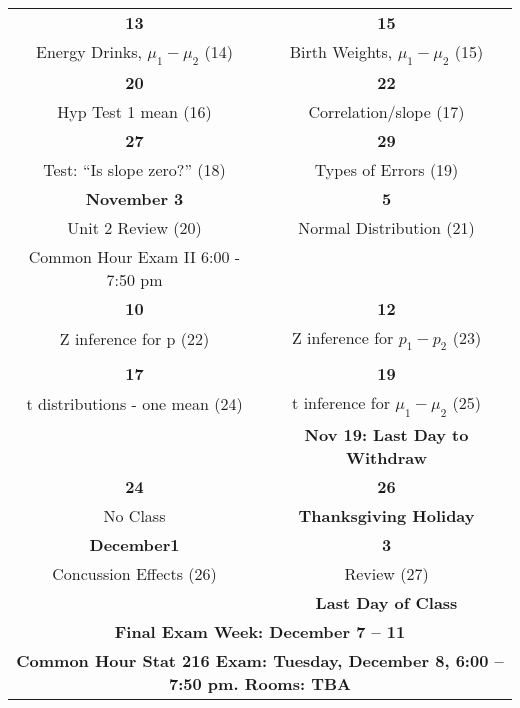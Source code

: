 \begin{center}
\begin{tabular}{|c|c|}
   \hfill\bf{13} & \hfill\bf{15} \\
 Energy Drinks, $\mu_1 - \mu_2$  \small{(14)}& 
 Birth Weights, $\mu_1 - \mu_2$ \small{(15)}  \\ 
\hline

 \hfill\bf{20}  & \hfill\bf{22} \\
Hyp Test 1 mean   \small{(16)}   &   
 Correlation/slope \small{(17)}\\ \hline

  \hfill\bf{27} & \hfill\bf{29} \\
  Test: ``Is slope zero?'' \small{(18)} &  
Types of Errors \small{(19)} %
 \\ \hline

   \bf{November} \hfill\bf{3} & \hfill\bf{5} \\
 Unit 2  Review   \small{(20)}&  
 Normal Distribution \small{(21)}  %
 \\
Common Hour Exam II 6:00 - 7:50 pm & \\
 \hline

   \hfill\bf{10} & \hfill\bf{12} \\
  Z inference for p   \small{(22)} 
 & Z inference for $p_1-p_2$  \small{(23)}
  \\
   &  \\ \hline

   \hfill\bf{17}  &  \hfill\bf{19}  \\
  t distributions - one mean  \small{(24)}&
  t inference for $\mu_1- \mu_2$  \small{(25)}\\ 
  &
   \small\bf{Nov 19: Last Day to Withdraw} \\ \hline
 
 \hfill\bf{24} & \hfill\bf{26} \\
No Class 
 & {\bf Thanksgiving Holiday} 
\\ \hline

  {\bf December}\hfill\bf{1} & \hfill\bf{3} \\
  Concussion Effects \small{(26)}
  & Review    \small{(27)}
\\
  &  \small\bf{ Last Day of Class}  \\ \hline

  \multicolumn{2}{|c|}{\textbf{Final Exam Week: December 7 -- 11 }} \\
  \multicolumn{2}{|c|}{\bf{ Common Hour Stat 216  Exam: 
      Tuesday, December 8, 6:00 -- 7:50 pm. Rooms: TBA}} \\
\hline

\end{tabular}
\vspace{.2in} \\
\end{center}
%  
